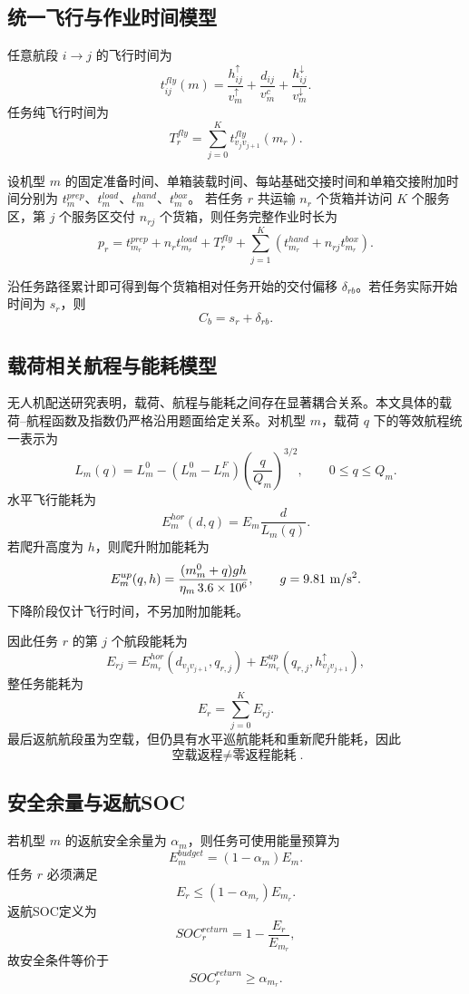 \documentclass[UTF8,a4paper,12pt]{ctexart}
\begin{document}
\subsection{统一飞行与作业时间模型}

任意航段 $i\rightarrow j$ 的飞行时间为
\[
t_{ij}^{fly}(m)
=
\frac{h_{ij}^{\uparrow}}{v_m^{\uparrow}}
+
\frac{d_{ij}}{v_m^c}
+
\frac{h_{ij}^{\downarrow}}{v_m^{\downarrow}}.
\]
任务纯飞行时间为
\[
T_r^{fly}
=
\sum_{j=0}^{K}
t_{v_jv_{j+1}}^{fly}(m_r).
\]

设机型 $m$ 的固定准备时间、单箱装载时间、每站基础交接时间和单箱交接附加时间分别为
$t_m^{prep}$、$t_m^{load}$、$t_m^{hand}$、$t_m^{box}$。
若任务 $r$ 共运输 $n_r$ 个货箱并访问 $K$ 个服务区，第 $j$ 个服务区交付 $n_{rj}$ 个货箱，则任务完整作业时长为
\[
p_r
=
t_{m_r}^{prep}
+
n_rt_{m_r}^{load}
+
T_r^{fly}
+
\sum_{j=1}^{K}
\left(
t_{m_r}^{hand}
+
n_{rj}t_{m_r}^{box}
\right).
\]

沿任务路径累计即可得到每个货箱相对任务开始的交付偏移 $\delta_{rb}$。若任务实际开始时间为 $s_r$，则
\[
C_b=s_r+\delta_{rb}.
\]

\subsection{载荷相关航程与能耗模型}

无人机配送研究表明，载荷、航程与能耗之间存在显著耦合关系\cite{dorling2017,zhang2021energy,zhang2023corrigendum}。本文具体的载荷--航程函数及指数仍严格沿用题面给定关系。对机型 $m$，载荷 $q$ 下的等效航程统一表示为
\[
\boxed{
L_m(q)
=
L_m^0
-
(L_m^0-L_m^F)
\left(\frac{q}{Q_m}\right)^{3/2}
},
\qquad 0\le q\le Q_m.
\]
水平飞行能耗为
\[
E_m^{hor}(d,q)
=
E_m\frac{d}{L_m(q)}.
\]
若爬升高度为 $h$，则爬升附加能耗为
\[
E_m^{up}(q,h)
=
\frac{(m_m^0+q)gh}{\eta_m\,3.6\times10^6},
\qquad g=9.81\ {\rm m/s^2}.
\]
下降阶段仅计飞行时间，不另加附加能耗。

因此任务 $r$ 的第 $j$ 个航段能耗为
\[
E_{rj}
=
E_{m_r}^{hor}
(d_{v_jv_{j+1}},q_{r,j})
+
E_{m_r}^{up}
(q_{r,j},h_{v_jv_{j+1}}^\uparrow),
\]
整任务能耗为
\[
E_r=\sum_{j=0}^{K}E_{rj}.
\]
最后返航航段虽为空载，但仍具有水平巡航能耗和重新爬升能耗，因此
\[
\boxed{\text{空载返程}\neq\text{零返程能耗}}.
\]

\subsection{安全余量与返航SOC}

若机型 $m$ 的返航安全余量为 $\alpha_m$，则任务可使用能量预算为
\[
E_m^{budget}=(1-\alpha_m)E_m.
\]
任务 $r$ 必须满足
\[
E_r\le(1-\alpha_{m_r})E_{m_r}.
\]
返航SOC定义为
\[
SOC_r^{return}
=
1-\frac{E_r}{E_{m_r}},
\]
故安全条件等价于
\[
SOC_r^{return}\ge\alpha_{m_r}.
\]
\end{document}
